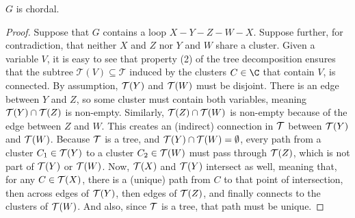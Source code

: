 \begin{lproof}
    \begin{iclaim}
        $G$ is chordal.
    \end{iclaim}
    \begin{proof}
        Suppose that $G$ contains a loop $X{-}Y{-}Z{-}W{-}X$.
        Suppose further, for contradiction, that neither $X$ and $Z$ nor $Y$ and $W$ share a cluster.
        Given a variable $V$, it is easy to see that property (2) of the tree decomposition ensures that the subtree $\mathcal T(V) \subseteq \mathcal T$ induced by the clusters $C \in \C$ that contain $V$, is connected.
        By assumption, ${\cal T}(Y)$ and ${\cal T}(W)$ must be disjoint. 
        There is an edge between $Y$ and $Z$, so some cluster must contain both variables, meaning ${\cal T}(Y) \cap {\cal T}(Z)$ is non-empty. 
        Similarly, ${\cal T}(Z) \cap {\cal T}(W)$ is non-empty because of the edge between $Z$ and $W$.
        This creates an (indirect) connection in $\cal T$ between ${\cal T}(Y)$ and ${\cal T}(W)$. Because $\cal T$ is a tree, and ${\cal T}(Y) \cap {\cal T}(W) = \emptyset$,
        every path from a cluster $C_1 \in {\cal T}(Y)$ to a cluster $C_2 \in {\cal T}(W)$ must pass through ${\cal T}(Z)$, which is not part of ${\cal T}(Y)$ or ${\cal T}(W)$. 
        Now, ${\cal T}(X)$ and ${\cal T}(Y)$ intersect as well, meaning that, for any $C \in {\cal T}(X)$, there is a (unique) path from $C$ to that point of intersection, then across edges of ${\cal T}(Y)$, then edges of ${\cal T}(Z)$, and finally connects to the clusters of ${\cal T}(W)$. And also, since $\cal T$ is a tree, that path must be unique. 

\end{proof}
\end{lproof}
